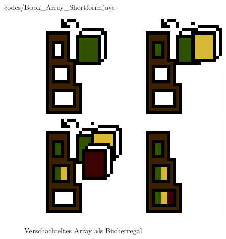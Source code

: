 \documentclass{../tuda-beamer}
\begin{document}
    \begin{frame}[c]
        \begin{figure}[h]
            \centering
            
        \end{figure}
    \end{frame}

    \begin{frame}[c]
        
    \end{frame}

    \begin{frame}
        
        {codes/Book_Array_Shortform.java}
    \end{frame}

    \begin{frame}[c]
        \begin{figure}[h]
            \centering
            \includegraphics[width=.2\linewidth]{graphics/lib_2_1.png}
            \includegraphics[width=.2\linewidth]{graphics/lib_2_2.png}
            \includegraphics[width=.2\linewidth]{graphics/lib_2_3.png}
            \includegraphics[width=.2\linewidth]{graphics/lib_2_4.png}
            \caption{Verschachteltes Array als Bücherregal}
        \end{figure}
    \end{frame}
\end{document}
